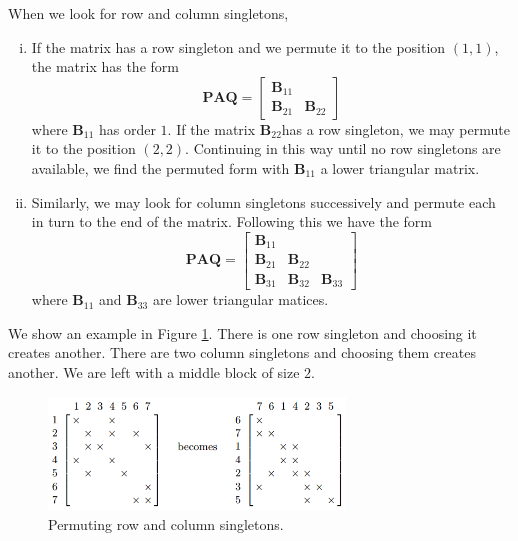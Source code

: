 \begin{alg}
  When we look for row and column singletons,
  \begin{enumerate}[(i)]
  \item If the matrix has a row singleton and we permute it to the
    position $(1,1)$, the matrix has the form
    $$\mathbf{PAQ}=\left[
      \begin{array}{cc}
        \mathbf{B}_{11}& \\ \mathbf{B}_{21} & \mathbf{B}_{22}
      \end{array}
    \right]$$ where $\mathbf{B}_{11}$ has order $1$. If the matrix $\mathbf{B}_{22}$has
    a row singleton, we may permute it to the position
    $(2,2)$. Continuing in this way until no row singletons are
    available, we find the permuted form with $\mathbf{B}_{11}$ a lower
    triangular matrix.
  \item Similarly, we may look for column singletons successively and
    permute each in turn to the end of the matrix. Following this we
    have the form
     $$\mathbf{PAQ}=\left[
      \begin{array}{ccc}
        \mathbf{B}_{11}& & \\ \mathbf{B}_{21} & \mathbf{B}_{22} & \\
        \mathbf{B}_{31} & \mathbf{B}_{32} & \mathbf{B}_{33}
      \end{array}\right]
      $$ where $\mathbf{B}_{11}$ and $\mathbf{B}_{33}$ are lower triangular matices.
    \end{enumerate}
  \end{alg}

  \begin{exm}
    We show an example in Figure \ref{fig:Singletons}. There is one
    row singleton and choosing it creates another. There are two
    column singletons and choosing them creates another. We are left
    with a middle block of size $2$.
    
    \begin{figure}[H]
    \centering
    \includegraphics[height=3cm]{png/Singletons.png}
    \caption{Permuting row and column singletons.}
      \label{fig:Singletons}
  \end{figure}
\end{exm}

